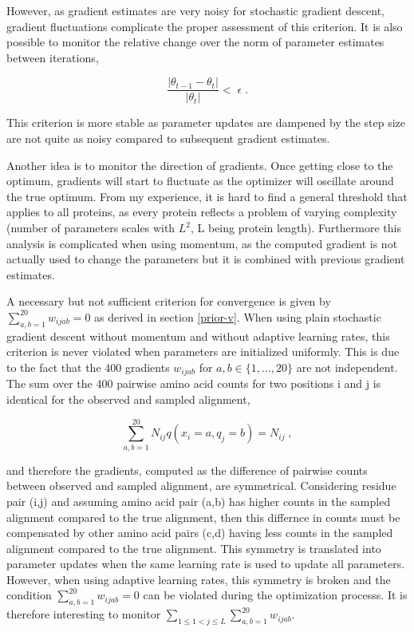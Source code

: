 \documentclass[12pt,a4paper,twoside]{book}
\newcommand{\eq}{\!=\!}
\newcommand{\wijab}{w_{ijab}}
\theoremstyle{definition}
\theoremstyle{definition}
\theoremstyle{remark}
\begin{document}
However, as gradient estimates are very noisy for stochastic gradient
descent, gradient fluctuations complicate the proper assessment of this
criterion. It is also possible to monitor the relative change over the
norm of parameter estimates between iterations,

\begin{equation}
  \frac{|\theta_{t-1} - \theta_t|}{|\theta_t|}  < \; \epsilon  \; .
  \label{eq:parameter-convergence-criterion}
\end{equation}

This criterion is more stable as parameter updates are dampened by the
step size are not quite as noisy compared to subsequent gradient
estimates.

Another idea is to monitor the direction of gradients. Once getting
close to the optimum, gradients will start to fluctuate as the optimizer
will oscillate around the true optimum. From my experience, it is hard
to find a general threshold that applies to all proteins, as every
protein reflects a problem of varying complexity (number of parameters
scales with \(L^2\), L being protein length). Furthermore this analysis
is complicated when using momentum, as the computed gradient is not
actually used to change the parameters but it is combined with previous
gradient estimates.

A necessary but not sufficient criterion for convergence is given by
\(\sum_{a,b=1}^{20} \wijab = 0\) as derived in section \ref{prior-v}.
When using plain stochastic gradient descent without momentum and
without adaptive learning rates, this criterion is never violated when
parameters are initialized uniformly. This is due to the fact that the
400 gradients \(\wijab\) for \(a,b \in \{1, \ldots, 20\}\) are not
independent. The sum over the 400 pairwise amino acid counts for two
positions i and j is identical for the observed and sampled alignment,

\begin{equation}
  \sum_{a,b=1}^{20} N_{ij} q(x_i \eq a, q_j \eq b) = N_{ij} \; ,
\end{equation}

and therefore the gradients, computed as the difference of pairwise
counts between observed and sampled alignment, are symmetrical.
Considering residue pair (i,j) and assuming amino acid pair (a,b) has
higher counts in the sampled alignment compared to the true alignment,
then this differnce in counts must be compensated by other amino acid
pairs (c,d) having less counts in the sampled alignment compared to the
true alignment. This symmetry is translated into parameter updates when
the same learning rate is used to update all parameters. However, when
using adaptive learning rates, this symmetry is broken and the condition
\(\sum_{a,b=1}^{20} \wijab = 0\) can be violated during the optimization
processs. It is therefore interesting to monitor
\(\sum_{1 \le 1 < j \le L} \sum_{a,b=1}^{20} \wijab\).
\end{document}
